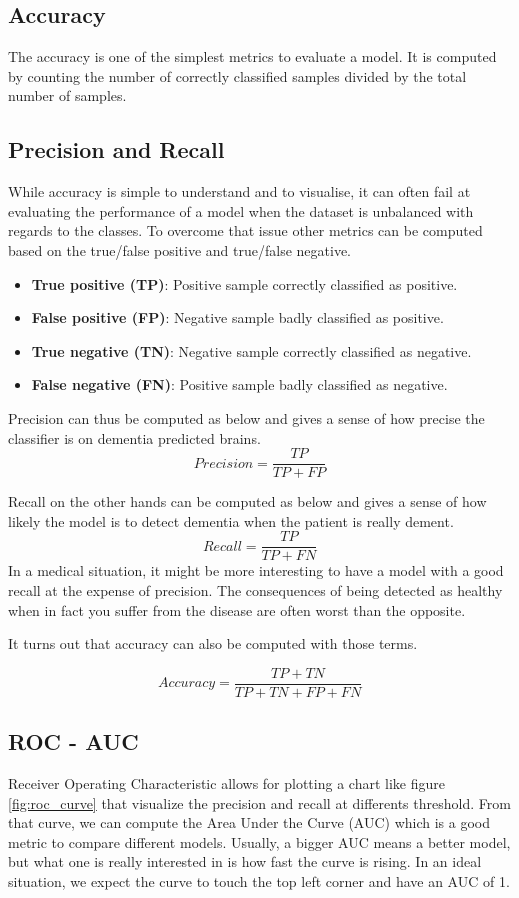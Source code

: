 \subsection{Accuracy}
The accuracy is one of the simplest metrics to evaluate a model. It is computed by counting the number of correctly classified samples divided by the total number of samples.


\subsection{Precision and Recall}
While accuracy is simple to understand and to visualise, it can often fail at evaluating the performance of a model when the dataset is unbalanced with regards to the classes. To overcome that issue other metrics can be computed based on the true/false positive and true/false negative.

\begin{itemize}
    \item \textbf{True positive (TP)}: Positive sample correctly classified as positive. 
    \item \textbf{False positive (FP)}: Negative sample badly classified as positive. 
    \item \textbf{True negative (TN)}: Negative sample correctly classified as negative. 
    \item \textbf{False negative (FN)}: Positive sample badly classified as negative.
\end{itemize}

Precision can thus be computed as below and gives a sense of how precise the classifier is on dementia predicted brains.
$$Precision = \frac{TP}{TP +  FP}$$

Recall on the other hands can be computed as below and gives a sense of how likely the model is to detect dementia when the patient is really dement.
$$Recall =\frac{TP}{TP + FN}$$
In a medical situation, it might be more interesting to have a model with a good recall at the expense of precision. The consequences of being detected as healthy when in fact you suffer from the disease are often worst than the opposite. 

It turns out that accuracy can also be computed with those terms.


$$Accuracy = \frac{TP + TN}{TP + TN + FP + FN}$$


\subsection{ROC - AUC}
Receiver Operating Characteristic allows for plotting a chart like figure \ref{fig:roc_curve} that visualize the precision and recall at differents threshold. From that curve, we can compute the Area Under the Curve (AUC) which is a good metric to compare different models. Usually, a bigger AUC means a better model, but what one is really interested in is how fast the curve is rising.
In an ideal situation, we expect the curve to touch the top left corner and have an AUC of 1.

